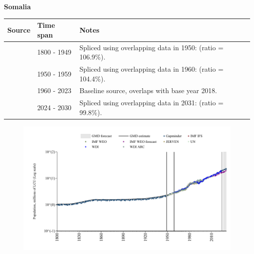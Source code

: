 \documentclass[12pt,a4paper,landscape]{article}
\begin{document}
\begin{adjustbox}{max totalsize={\paperwidth}{\paperheight},center}
\begin{minipage}[t][\textheight][t]{\textwidth}
\vspace*{0.5cm}
{}
\begin{center}
{\Large\bfseries Somalia}
\end{center}
\vspace{0.5cm}
\begin{table}[H]
\centering
\small
\begin{tabular}{|l|l|l|}
\hline
\textbf{Source} & \textbf{Time span} & \textbf{Notes} \\
\hline
\rowcolor{white}\cite{Gapminder}& 1800 - 1949 &Spliced using overlapping data in 1950: (ratio = 106.9\%).\\
\rowcolor{lightgray}\cite{IMF_IFS}& 1950 - 1959 &Spliced using overlapping data in 1960: (ratio = 104.4\%).\\
\rowcolor{white}\cite{WDI}& 1960 - 2023 &Baseline source, overlaps with base year 2018.\\
\rowcolor{lightgray}\cite{Gapminder}& 2024 - 2030 &Spliced using overlapping data in 2031: (ratio = 99.8\%).\\
\hline
\end{tabular}
\end{table}
\begin{figure}[H]
\centering
\includegraphics[width=\textwidth,height=0.6\textheight,keepaspectratio]{graphs/SOM_pop.pdf}
\end{figure}
\end{minipage}
\end{adjustbox}
\end{document}
